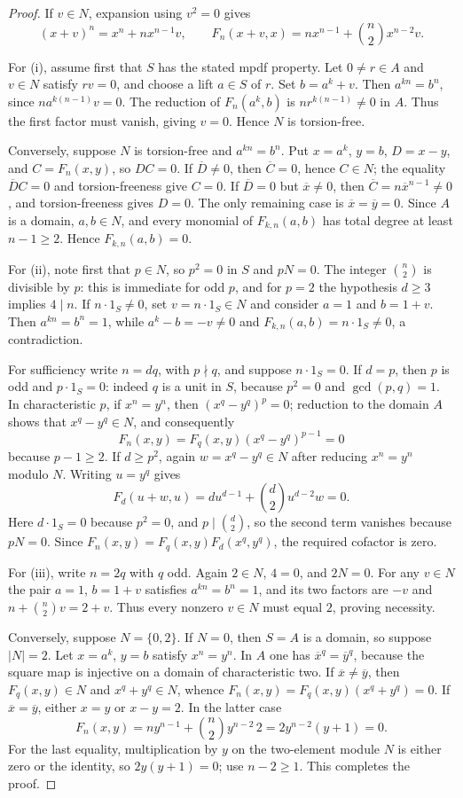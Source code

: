 \documentclass[11pt,a4paper]{amsart}
\theoremstyle{definition}
\theoremstyle{remark}
\numberwithin{equation}{section}
\begin{document}
\begin{proof}
If $v\in N$, expansion using $v^2=0$ gives
\[
 (x+v)^n=x^n+n x^{n-1}v,
 \qquad
 F_n(x+v,x)=n x^{n-1}+\binom n2 x^{n-2}v.
\]

For (i), assume first that $S$ has the stated mpdf property. Let
$0\neq r\in A$ and $v\in N$ satisfy $rv=0$, and choose a lift $a\in S$ of
$r$. Set $b=a^k+v$. Then $a^{kn}=b^n$, since
$n a^{k(n-1)}v=0$. The reduction of $F_n(a^k,b)$ is
$n r^{k(n-1)}\neq0$ in $A$. Thus the first factor must vanish, giving
$v=0$. Hence $N$ is torsion-free.

Conversely, suppose $N$ is torsion-free and $a^{kn}=b^n$. Put
$x=a^k$, $y=b$, $D=x-y$, and $C=F_n(x,y)$, so $DC=0$.
If $\overline D\neq0$, then $\overline C=0$, hence $C\in N$; the equality
$\overline D C=0$ and torsion-freeness give $C=0$.
If $\overline D=0$ but $\overline x\neq0$, then
$\overline C=n\overline x^{n-1}\neq0$, and torsion-freeness gives $D=0$.
The only remaining case is $\overline x=\overline y=0$. Since $A$ is a
domain, $a,b\in N$, and every monomial of $F_{k,n}(a,b)$ has total degree
at least $n-1\geq2$. Hence $F_{k,n}(a,b)=0$.

For (ii), note first that $p\in N$, so $p^2=0$ in $S$ and $pN=0$.
The integer $\binom n2$ is divisible by $p$: this is immediate for odd
$p$, and for $p=2$ the hypothesis $d\geq3$ implies $4\mid n$.
If $n\cdot1_S\neq0$, set $v=n\cdot1_S\in N$ and consider $a=1$ and
$b=1+v$. Then $a^{kn}=b^n=1$, while $a^k-b=-v\neq0$ and
$F_{k,n}(a,b)=n\cdot1_S\neq0$, a contradiction.

For sufficiency write $n=dq$, with $p\nmid q$, and suppose $n\cdot1_S=0$.
If $d=p$, then $p$ is odd and $p\cdot1_S=0$: indeed $q$ is a unit in
$S$, because $p^2=0$ and $\gcd(p,q)=1$. In characteristic $p$, if
$x^n=y^n$, then $(x^q-y^q)^p=0$; reduction to the domain $A$ shows that
$x^q-y^q\in N$, and consequently
\[
 F_n(x,y)=F_q(x,y)(x^q-y^q)^{p-1}=0
\]
because $p-1\geq2$.
If $d\geq p^2$, again $w=x^q-y^q\in N$ after reducing $x^n=y^n$ modulo
$N$. Writing $u=y^q$ gives
\[
 F_d(u+w,u)=d u^{d-1}+\binom d2 u^{d-2}w=0.
\]
Here $d\cdot1_S=0$ because $p^2=0$, and $p\mid\binom d2$, so the second
term vanishes because $pN=0$. Since
$F_n(x,y)=F_q(x,y)F_d(x^q,y^q)$, the required cofactor is zero.

For (iii), write $n=2q$ with $q$ odd. Again $2\in N$, $4=0$, and $2N=0$.
For any $v\in N$ the pair $a=1$, $b=1+v$ satisfies $a^{kn}=b^n=1$,
and its two factors are $-v$ and
$n+\binom n2v=2+v$. Thus every nonzero $v\in N$ must equal $2$, proving
necessity.

Conversely, suppose $N=\{0,2\}$. If $N=0$, then $S=A$ is a domain,
so suppose $|N|=2$. Let $x=a^k$, $y=b$ satisfy $x^n=y^n$.
In $A$ one has $\overline x^q=\overline y^q$, because the square map is
injective on a domain of characteristic two. If
$\overline x\neq\overline y$, then $F_q(x,y)\in N$ and
$x^q+y^q\in N$, whence
$F_n(x,y)=F_q(x,y)(x^q+y^q)=0$.
If $\overline x=\overline y$, either $x=y$ or $x-y=2$. In the latter case
\[
 F_n(x,y)=n y^{n-1}+\binom n2 y^{n-2}\,2
         =2y^{n-2}(y+1)=0.
\]
For the last equality, multiplication by $y$ on the two-element module
$N$ is either zero or the identity, so $2y(y+1)=0$; use $n-2\geq1$.
This completes the proof.
\end{proof}
\end{document}
